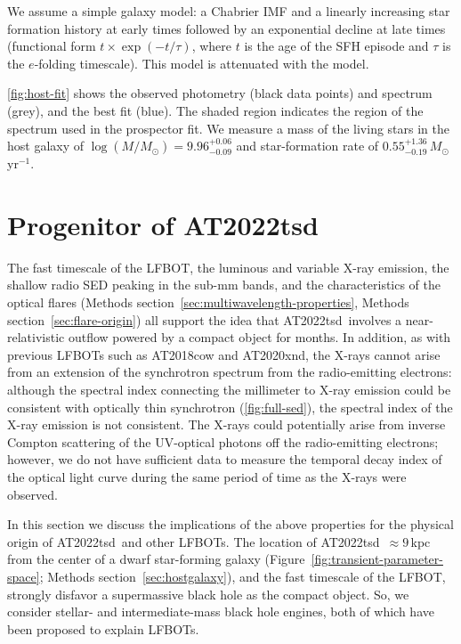 \documentclass{nature_plusfigure}
\newcommand{\at}{AT2022tsd}
\begin{document}
\begin{methods}
We assume a simple galaxy model: a Chabrier IMF \cite{Chabrier2003} and a linearly increasing star formation history at early times followed by an exponential decline at late times (functional form $t \times \exp\left(-t/\tau\right)$, where $t$ is the age of the SFH episode and $\tau$ is the $e$-folding timescale). This model is attenuated with the \cite{Calzetti2000} model. 

\ref{fig:host-fit} shows the observed photometry (black data points) and spectrum (grey), and the best fit (blue). The shaded region indicates the region of the spectrum used in the prospector fit. We measure a mass of the living stars in the host galaxy of $\log(M/M_\odot)=9.96^{+0.06}_{-0.09}$ and star-formation rate of $0.55^{+1.36}_{-0.19}\,M_\odot\,$yr$^{-1}$.

\section{Progenitor of \at}
\label{sec:at2022tsd-origin}

The fast timescale of the LFBOT, the luminous and variable X-ray emission, the shallow radio SED peaking in the sub-mm bands, and the characteristics of the optical flares (Methods section~\ref{sec:multiwavelength-properties}, Methods section~\ref{sec:flare-origin}) all support the idea that \at\ involves a near-relativistic outflow powered by a compact object for months.
In addition, as with previous LFBOTs such as AT2018cow and AT2020xnd, the X-rays cannot arise from an extension of the synchrotron spectrum from the radio-emitting electrons\cite{Margutti2019,Ho2019,Ho2022_AT2020xnd}: although the spectral index connecting the millimeter to X-ray emission could be consistent with optically thin synchrotron (\ref{fig:full-sed}), the spectral index of the X-ray emission is not consistent.
The X-rays could potentially arise from inverse Compton scattering of the UV-optical photons off the radio-emitting electrons; however, we do not have sufficient data to measure the temporal decay index of the optical light curve during the same period of time as the X-rays were observed.

In this section we discuss the implications of the above properties for the physical origin of \at\ and other LFBOTs. The location of \at\ $\approx9\,$kpc from the center of a dwarf star-forming galaxy (Figure~\ref{fig:transient-parameter-space}; Methods section~\ref{sec:hostgalaxy}), and the fast timescale of the LFBOT, strongly disfavor a supermassive black hole as the compact object. So, we consider stellar- and intermediate-mass black hole engines, both of which have been proposed to explain LFBOTs\cite{Perley2019,Margutti2019,Metzger2022,Chen2023}. 


\end{methods}
\end{document}
